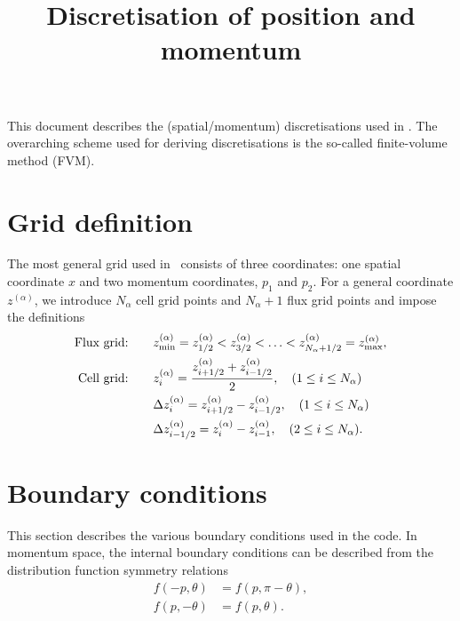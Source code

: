 \documentclass{notes}
\title{Discretisation of position and momentum}
\author{}
\begin{document}
    \maketitle

    \noindent
    This document describes the (spatial/momentum) discretisations used in \DREAM.
    The overarching scheme used for deriving discretisations is the so-called
    finite-volume method (FVM).

    \tableofcontents

    \section{Grid definition}
    The most general grid used in \DREAM\ consists of three coordinates: one
    spatial coordinate $x$ and two momentum coordinates, $p_1$ and $p_2$. For
    a general coordinate $z^{(\alpha)}$, we introduce $N_\alpha$ cell grid points and
    $N_\alpha+1$ flux grid points and impose the definitions
    \begin{equation}
        \begin{aligned}
            \text{Flux grid:} & \qquad z^{(\alpha)}_{\rm min} = z^{(\alpha)}_{1/2} < z^{(\alpha)}_{3/2} < \ldots < z^{(\alpha)}_{N_\alpha+1/2} = z^{(\alpha)}_{\rm max},\\
            \text{Cell grid:} & \qquad z^{(\alpha)}_i = \frac{z^{(\alpha)}_{i+1/2} + z^{(\alpha)}_{i-1/2}}{2}, \quad (1\leq i \leq N_\alpha)\\
            &\qquad \Delta z^{(\alpha)}_i = z^{(\alpha)}_{i+1/2} - z^{(\alpha)}_{i-1/2}, \quad (1\leq i \leq N_\alpha)\\
            &\qquad \Delta z^{(\alpha)}_{i-1/2} = z^{(\alpha)}_i - z^{(\alpha)}_{i-1},\quad (2\leq i \leq N_\alpha).
        \end{aligned}
    \end{equation}

    \section{Boundary conditions}
    This section describes the various boundary conditions used in the code.
    In momentum space, the internal boundary conditions can be described from
    the distribution function symmetry relations
    \begin{equation}\label{eq:fsymmetry}
        \begin{aligned}
            f(-p,\theta) &= f(p,\pi-\theta),\\
            f(p,-\theta) &= f(p,\theta).
        \end{aligned}
    \end{equation}
\end{document}
